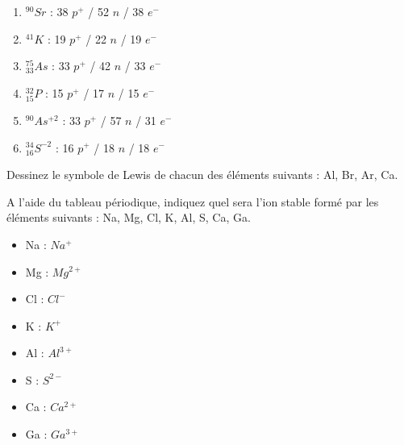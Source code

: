 \documentclass[
  11pt,
  a4paper,
  openany]{book}
\providecommand{\tightlist}{%
  \setlength{\itemsep}{0pt}\setlength{\parskip}{0pt}}
\begin{document}
\begin{Answer}

\begin{enumerate}
\def\labelenumi{\arabic{enumi}.}
\tightlist
\item
  \(^{90}Sr\) : 38 \(p^+\) / 52 \(n\) / 38 \(e^-\)
\item
  \(^{41}K\) : 19 \(p^+\) / 22 \(n\) / 19 \(e^-\)
\item
  \(^{75}_{33}As\) : 33 \(p^+\) / 42 \(n\) / 33 \(e^-\)
\item
  \(^{32}_{15}P\) : 15 \(p^+\) / 17 \(n\) / 15 \(e^-\)
\item
  \(^{90}As^{+2}\) : 33 \(p^+\) / 57 \(n\) / 31 \(e^-\)
\item
  \(^{34}_{16}S^{-2}\) : 16 \(p^+\) / 18 \(n\) / 18 \(e^-\)
\end{enumerate}

\end{Answer}

\begin{Exercise}

Dessinez le symbole de Lewis de chacun des éléments suivants : Al, Br, Ar, Ca.


\end{Exercise}

\begin{Exercise}

A l'aide du tableau périodique, indiquez quel sera l'ion stable formé par les éléments suivants : Na, Mg, Cl, K, Al, S, Ca, Ga.


\end{Exercise}

\begin{Answer}

\begin{itemize}
\tightlist
\item
  Na : \(Na^+\)
\item
  Mg : \(Mg^{2+}\)
\item
  Cl : \(Cl^-\)
\item
  K : \(K^+\)
\item
  Al : \(Al^{3+}\)
\item
  S : \(S^{2-}\)
\item
  Ca : \(Ca^{2+}\)
\item
  Ga : \(Ga^{3+}\)
\end{itemize}

\end{Answer}
\end{document}
